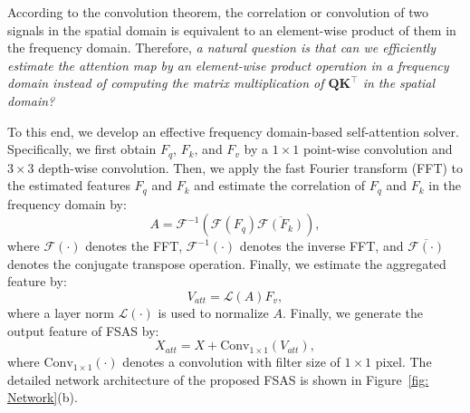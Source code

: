 \documentclass[10pt,twocolumn,letterpaper]{article}
\begin{document}
According to the convolution theorem, the correlation or convolution of two signals in the spatial domain is equivalent to an element-wise product of them in the frequency domain.
Therefore, \textit{a natural question is that can we efficiently estimate the attention map by an element-wise product operation in a frequency domain instead of computing the matrix multiplication of $\mathbf{QK}^{\top}$ in the spatial domain? }


To this end, we develop an effective frequency domain-based self-attention solver.
Specifically, we first obtain $F_q$, $F_k$, and $F_v$ by a $1\times 1$ point-wise convolution and $3\times 3$ depth-wise convolution. Then, we apply the fast Fourier transform (FFT) to the estimated features $F_q$ and $F_k$ and estimate the correlation of $F_q$ and $F_k$ in the frequency domain by:
\begin{equation}
A = \mathcal{F}^{-1}\left(\mathcal{F}(F_q)\overline{\mathcal{F}(F_k)}\right),
\label{eq: fft-attnetion}
\end{equation}
where $\mathcal{F}(\cdot)$ denotes the FFT, $\mathcal{F}^{-1}(\cdot)$ denotes the inverse FFT, and $\overline{\mathcal{F}(\cdot)}$ denotes the conjugate transpose operation.
Finally, we estimate the aggregated feature by:
\begin{equation}
V_{att} = \mathcal{L}\left(A\right)F_v,
\label{eq: fft-transformer}
\end{equation}
where a layer norm $\mathcal{L}(\cdot)$ is used to normalize $A$.
Finally, we generate the output feature of FSAS by:
\begin{equation}
X_{att} = X + \mathrm{Conv}_{1\times 1}(V_{att}),
\label{eq: fft-transformer}
\end{equation}
where $\mathrm{Conv}_{1\times 1}(\cdot)$ denotes a convolution with filter size of $1\times 1$ pixel.
The detailed network architecture of the proposed FSAS is shown in Figure~\ref{fig: Network}(b).
\end{document}

